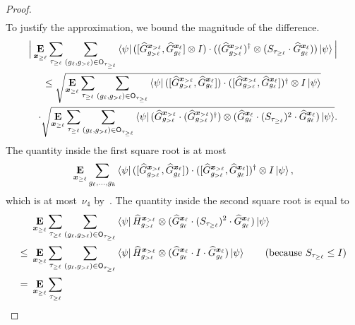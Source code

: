 \begin{proof}
\begin{align}
\label{eq:commute-g-part-one}
\end{align}
To justify the approximation, we bound the magnitude of the difference.
\begin{multline}\label{eq:call-this-later}
\Big|  \mathop{\bf E\/}_{{\boldsymbol{x}}_{\geq \ell}} \sum_{\tau_{\geq \ell}}
  \sum_{(g_{\ell}, g_{>\ell}) \in \mathsf{O}_{\tau_{\geq \ell}}}
  \bra{\psi}     ([ \widehat{G}^{{\boldsymbol{x}}_{>\ell}}_{g_{>\ell}},
    \widehat{G}^{{\boldsymbol{x}}_\ell}_{g_\ell} ] \otimes I) \cdot     ((\widehat{G}^{{\boldsymbol{x}}_{>\ell}}_{g_{>\ell}})^\dagger \otimes
    (S_{\tau_{\geq \ell}} \cdot
  \widehat{G}^{{\boldsymbol{x}}_\ell}_{g_\ell})) \ket{\psi} \Big|  \\
  \leq \sqrt{ \mathop{\bf E\/}_{{\boldsymbol{x}}_{\geq \ell}} \sum_{\tau_{\geq \ell}}
  \sum_{(g_{\ell}, g_{>\ell}) \in \mathsf{O}_{\tau_{\geq \ell}}} \bra{\psi} ([ \widehat{G}^{{\boldsymbol{x}}_{>\ell}}_{g_{>\ell}},
    \widehat{G}^{{\boldsymbol{x}}_\ell}_{g_\ell} ]) \cdot ([ \widehat{G}^{{\boldsymbol{x}}_{>\ell}}_{g_{>\ell}},
    \widehat{G}^{{\boldsymbol{x}}_\ell}_{g_\ell} ])^\dagger \otimes I \ket{\psi}}  \\
  \quad \cdot \sqrt{\mathop{\bf E\/}_{{\boldsymbol{x}}_{\geq \ell}} \sum_{\tau_{\geq \ell}}
   \sum_{(g_{\ell}, g_{>\ell}) \in \mathsf{O}_{\tau_{\geq \ell}}} \bra{\psi}
    (\widehat{G}^{{\boldsymbol{x}}_{>\ell}}_{g_{>\ell}}\cdot (
    \widehat{G}^{{\boldsymbol{x}}_{>\ell}}_{g_{>\ell}})^\dagger) \otimes
    (\widehat{G}^{{\boldsymbol{x}}_{\ell}}_{g_\ell}  \cdot (S_{\tau_{\geq \ell}})^2
    \cdot \widehat{G}^{{\boldsymbol{x}}_{\ell}}_{g_\ell}) \ket{\psi}}.
\end{multline}
The quantity inside the first square root is at most
\begin{equation*}
\mathop{\bf E\/}_{{\boldsymbol{x}}_{\geq \ell}} \sum_{g_{\ell}, \ldots, g_k} \bra{\psi} ([ \widehat{G}^{{\boldsymbol{x}}_{>\ell}}_{g_{>\ell}},
    \widehat{G}^{{\boldsymbol{x}}_\ell}_{g_\ell} ]) \cdot ([ \widehat{G}^{{\boldsymbol{x}}_{>\ell}}_{g_{>\ell}},
    \widehat{G}^{{\boldsymbol{x}}_\ell}_{g_\ell} ])^\dagger \otimes I \ket{\psi},
\end{equation*}
which is at most~$\nu_4$ by~.
The quantity inside the second square root is equal to
\begin{align*}
&\E_{\bx_{\geq \ell}} \sum_{\tau_{\geq \ell}}
   \sum_{(g_{\ell}, g_{>\ell}) \in \sfO_{\tau_{\geq \ell}}} \bra{\psi}
    \wH^{\bx_{>\ell}}_{g_{>\ell}} \ot
    (\wG^{\bx_{\ell}}_{g_\ell}  \cdot (S_{\tau_{\geq \ell}})^2
    \cdot \wG^{\bx_{\ell}}_{g_\ell}) \ket{\psi}\\
\leq~
&\E_{\bx_{\geq \ell}} \sum_{\tau_{\geq \ell}}
   \sum_{(g_{\ell}, g_{>\ell}) \in \sfO_{\tau_{\geq \ell}}} \bra{\psi}
    \wH^{\bx_{>\ell}}_{g_{>\ell}} \ot
    (\wG^{\bx_{\ell}}_{g_\ell}  \cdot I
    \cdot \wG^{\bx_{\ell}}_{g_\ell}) \ket{\psi} \tag{because $S_{\tau_{\geq \ell}} \leq I$}\\
=~
&\E_{\bx_{\geq \ell}} \sum_{\tau_{\geq \ell}}

\end{align*}
\end{proof}
